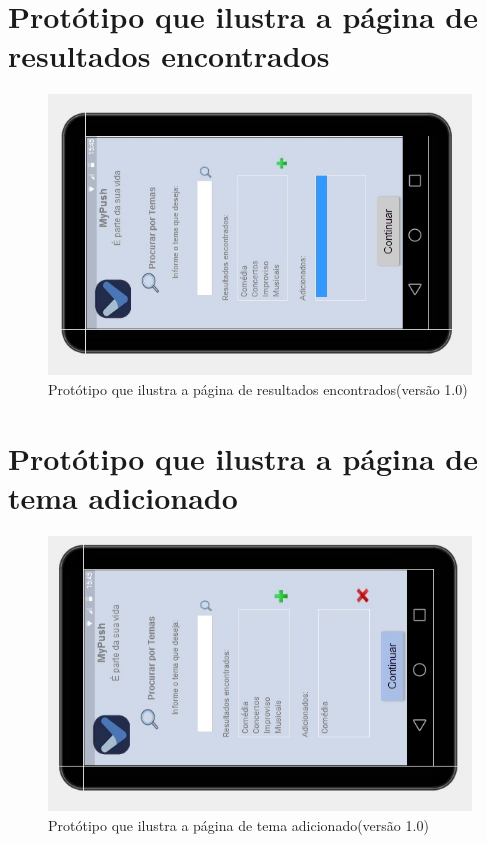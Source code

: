 \begin{apendicesenv}
      \section*{Protótipo que ilustra a página de resultados encontrados}

    \begin{figure}[!htbp]
      \centering
      \includegraphics[scale=0.5, angle=-90]{editaveis/figuras/prototipo_alta_fidelidade_v1/1_3}
      \caption{Protótipo que ilustra a página de resultados encontrados(versão 1.0)}
      \label{v1}
    \end{figure}
    
      \section*{Protótipo que ilustra a página de tema adicionado}

    \begin{figure}[!htbp]
      \centering
      \includegraphics[scale=0.5, angle=-90]{editaveis/figuras/prototipo_alta_fidelidade_v1/1_4}
      \caption{Protótipo que ilustra a página de tema adicionado(versão 1.0)}
      \label{v1}
    \end{figure}
    

\end{apendicesenv}

